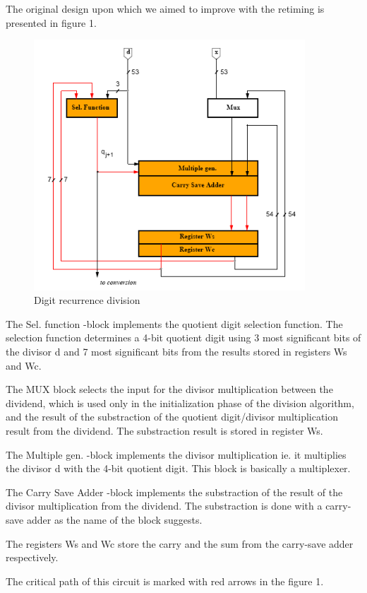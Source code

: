 \documentclass[11pt,a4paper]{article}
\begin{document}
The original design upon which we aimed to improve with the retiming is presented in figure 1.

\begin{figure}[h]
	\centering
		\includegraphics[width=4in]{./noretiming.PNG}
	\caption{Digit recurrence division}	\label{fig:noretiming}
\end{figure}


The Sel. function -block implements the quotient digit selection function. The selection function determines a 4-bit quotient digit using 3 most significant bits of the divisor d and 7 most significant bits from the results stored in registers Ws and Wc.

The MUX block selects the input for the divisor multiplication between the dividend, which is used only in the initialization phase of the division algorithm, and the result of the substraction of the quotient digit/divisor multiplication result from the dividend. The substraction result is stored in register Ws.

The Multiple gen. -block implements the divisor multiplication ie. it multiplies the divisor d with the 4-bit quotient digit. This block is basically a multiplexer.

The Carry Save Adder -block implements the substraction of the result of the divisor multiplication from the dividend. The substraction is done with a carry-save adder as the name of the block suggests.

The registers Ws and Wc store the carry and the sum from the carry-save adder respectively.

The critical path of this circuit is marked with red arrows in the figure 1.
\end{document}
